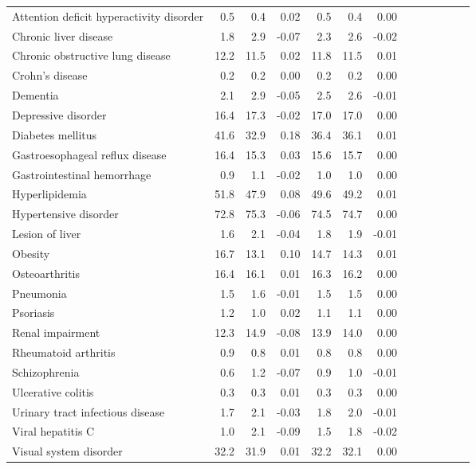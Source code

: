 \documentclass[11pt,]{article}
\begin{document}
\begin{longtable}{lrrrrrrrrrrrr}
      Attention deficit hyperactivity disorder &  0.5 &  0.4 &  0.02 &  0.5 &  0.4 &  0.00 \\ 
      Chronic liver disease &  1.8 &  2.9 & -0.07 &  2.3 &  2.6 & -0.02 \\ 
      Chronic obstructive lung disease & 12.2 & 11.5 &  0.02 & 11.8 & 11.5 &  0.01 \\ 
      Crohn's disease &  0.2 &  0.2 &  0.00 &  0.2 &  0.2 &  0.00 \\ 
      Dementia &  2.1 &  2.9 & -0.05 &  2.5 &  2.6 & -0.01 \\ 
      Depressive disorder & 16.4 & 17.3 & -0.02 & 17.0 & 17.0 &  0.00 \\ 
      Diabetes mellitus & 41.6 & 32.9 &  0.18 & 36.4 & 36.1 &  0.01 \\ 
      Gastroesophageal reflux disease & 16.4 & 15.3 &  0.03 & 15.6 & 15.7 &  0.00 \\ 
      Gastrointestinal hemorrhage &  0.9 &  1.1 & -0.02 &  1.0 &  1.0 &  0.00 \\ 
      Hyperlipidemia & 51.8 & 47.9 &  0.08 & 49.6 & 49.2 &  0.01 \\ 
      Hypertensive disorder & 72.8 & 75.3 & -0.06 & 74.5 & 74.7 &  0.00 \\ 
      Lesion of liver &  1.6 &  2.1 & -0.04 &  1.8 &  1.9 & -0.01 \\ 
      Obesity & 16.7 & 13.1 &  0.10 & 14.7 & 14.3 &  0.01 \\ 
      Osteoarthritis & 16.4 & 16.1 &  0.01 & 16.3 & 16.2 &  0.00 \\ 
      Pneumonia &  1.5 &  1.6 & -0.01 &  1.5 &  1.5 &  0.00 \\ 
      Psoriasis &  1.2 &  1.0 &  0.02 &  1.1 &  1.1 &  0.00 \\ 
      Renal impairment & 12.3 & 14.9 & -0.08 & 13.9 & 14.0 &  0.00 \\ 
      Rheumatoid arthritis &  0.9 &  0.8 &  0.01 &  0.8 &  0.8 &  0.00 \\ 
      Schizophrenia &  0.6 &  1.2 & -0.07 &  0.9 &  1.0 & -0.01 \\ 
      Ulcerative colitis &  0.3 &  0.3 &  0.01 &  0.3 &  0.3 &  0.00 \\ 
      Urinary tract infectious disease &  1.7 &  2.1 & -0.03 &  1.8 &  2.0 & -0.01 \\ 
      Viral hepatitis C &  1.0 &  2.1 & -0.09 &  1.5 &  1.8 & -0.02 \\ 
      Visual system disorder & 32.2 & 31.9 &  0.01 & 32.2 & 32.1 &  0.00 \\ 

\end{longtable}
\end{document}
